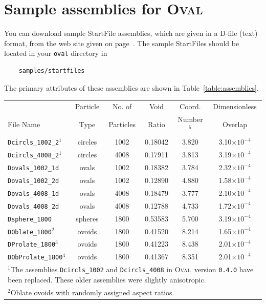 \documentclass[letterpaper,11pt]{article}
\newcommand{\Oval}{\textsc{Oval}}
\newcommand{\StartFile}{\textsf{StartFile}}
\begin{document}
\section{Sample assemblies for \Oval}\label{sec:samples}
You can download sample \textsf{StartFile} assemblies, 
which are given in a D-file (text) format,
from the web site given on page~\pageref{page:WebSite}.
The sample \StartFile s should be located in your \texttt{oval}
directory in 
\begin{verbatim}
    samples/startfiles
\end{verbatim}
The primary attributes of these assemblies 
are shown in Table~\ref{table:assemblies}.
\begin{table}
\centering
\begin{tabular}{lccccc}
\hline
\hline
          & Particle & No. of & Void  & Coord. & Dimensionless \\
File Name &   Type   & Particles & Ratio &   Number$^{5}$    &  Overlap      \\
\hline
\texttt{Dcircls\_1002\_2}$^{1}$&circles&1002&0.18042 &3.820 & 3.10$\times10^{-4}$\\
\texttt{Dcircls\_4008\_2}$^{1}$&circles&4008&0.17911 &3.813 & 3.19$\times10^{-4}$\\
\texttt{Dovals\_1002\_1d}      &ovals  &1002&0.18382 &3.784 & 2.32$\times10^{-4}$\\
\texttt{Dovals\_1002\_2d}      &ovals  &1002&0.12890 &4.880 & 1.58$\times10^{-4}$\\
\texttt{Dovals\_4008\_1d}      &ovals  &4008&0.18479 &3.777 & 2.10$\times10^{-4}$\\
\texttt{Dovals\_4008\_2d}      &ovals  &4008&0.12788 &4.733 & 1.72$\times10^{-4}$\\
\texttt{Dsphere\_1800}         &spheres&1800&0.53583 &5.700 & 3.19$\times10^{-4}$\\
\texttt{DOblate\_1800}$^{2}$   &ovoids &1800&0.41520 &8.214 & 1.65$\times10^{-4}$\\
\texttt{DProlate\_1800}$^{3}$  &ovoids &1800&0.41223 &8.438 & 2.01$\times10^{-4}$\\
\texttt{DObProlate\_1800}$^{4}$&ovoids &1800&0.41367 &8.351 & 2.01$\times10^{-4}$\\
\hline
\multicolumn{6}{l}{\parbox{4.80in}{%
$^{1}$The assemblies \texttt{Dcircls\_1002} and 
 \texttt{Dcircls\_4008} in \Oval\ version \texttt{0.4.0} have been
replaced.  These older assemblies were slightly anisotropic.}}\\
\multicolumn{6}{l}{\parbox{4.80in}{%
$^{2} $Oblate ovoids with randomly assigned aspect ratios.  
}}
\end{tabular}
\end{table}
\end{document}
